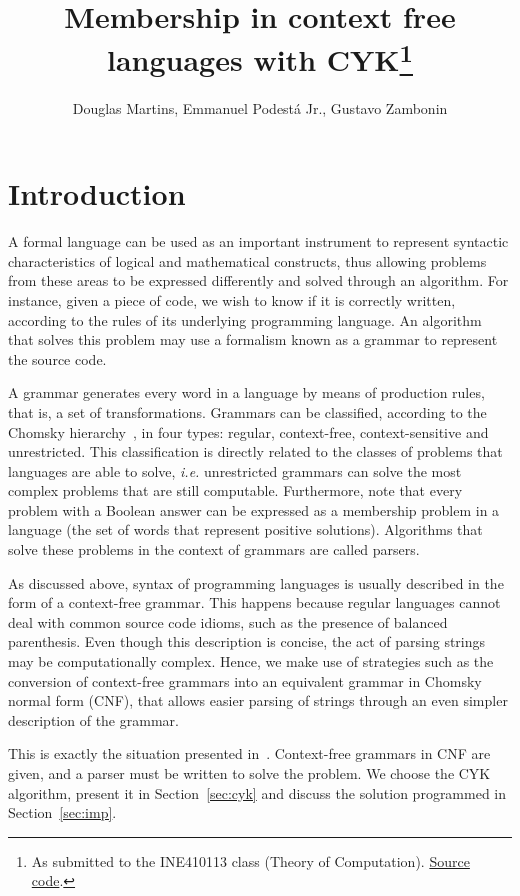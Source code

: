 \documentclass[12pt]{article}
\title{Membership in context free languages with CYK\footnote{
    As submitted to the INE410113 class (Theory of Computation). \href{https://github.com/zambonin/ine410113}{Source code}.}}
\author{Douglas Martins\inst{1}, Emmanuel Podestá Jr.\inst{1}, Gustavo Zambonin\inst{1}}
\begin{document}
 

\maketitle

\section{Introduction}\label{sec:intro}

A formal language can be used as an important instrument to represent syntactic characteristics of logical and mathematical constructs, thus allowing problems from these areas to be expressed differently and solved through an algorithm. For instance, given a piece of code, we wish to know if it is correctly written, according to the rules of its underlying programming language. An algorithm that solves this problem may use a formalism known as a grammar to represent the source code.

A grammar generates every word in a language by means of production rules, that is, a set of transformations. Grammars can be classified, according to the Chomsky hierarchy~\cite{Chomsky:article:1959:jun}, in four types: regular, context-free, context-sensitive and unrestricted. This classification is directly related to the classes of problems that languages are able to solve, \emph{i.e.} unrestricted grammars can solve the most complex problems that are still computable. Furthermore, note that every problem with a Boolean answer can be expressed as a membership problem in a language (the set of words that represent positive solutions). Algorithms that solve these problems in the context of grammars are called parsers.

As discussed above, syntax of programming languages is usually described in the form of a context-free grammar. This happens because regular languages cannot deal with common source code idioms, such as the presence of balanced parenthesis. Even though this description is concise, the act of parsing strings may be computationally complex. Hence, we make use of strategies such as the conversion of context-free grammars into an equivalent grammar in Chomsky normal form (CNF), that allows easier parsing of strings through an even simpler description of the grammar.

This is exactly the situation presented in~\cite{Guimaraes:misc:2018:oct}. Context-free grammars in CNF are given, and a parser must be written to solve the problem. We choose the CYK algorithm, present it in Section~\ref{sec:cyk} and discuss the solution programmed in Section~\ref{sec:imp}.
\end{document}
